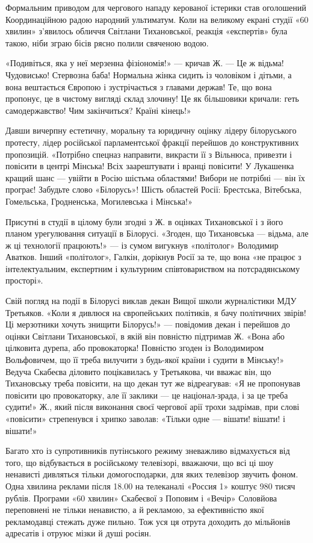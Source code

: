 Формальним приводом для чергового нападу керованої істерики став оголошений
Координаційною радою народний ультиматум.  Коли на великому екрані студії «60
хвилин» з’явилось обличчя Світлани Тихановської, реакція «експертів» була
такою, ніби зграю бісів рясно полили свяченою водою.

«Подивіться, яка у неї мерзенна фізіономія!»  --- кричав Ж. --- Це ж відьма!
Чудовисько!  Стервозна баба!  Нормальна жінка сидить із чоловіком і дітьми, а
вона вештається Європою і зустрічається з главами держав!  Те, що вона
пропонує, це в чистому вигляді склад злочину!  Це як більшовики кричали: геть
самодержавство!  Чим закінчиться?  Країні кінець!»

Давши вичерпну естетичну, моральну та юридичну оцінку лідеру білоруського
протесту, лідер російської парламентської фракції перейшов до конструктивних
пропозицій. «Потрібно спецназ направити, викрасти її з Вільнюса, привезти і
повісити в центрі Мінська!  Всіх заарештувати і вранці повісити!  У Лукашенка
кращий шанс --- увійти в Росію шістьма областями!  Вибори не потрібні --- він їх
програє!  Забудьте слово «Білорусь»!  Шість областей Росії: Брестська,
Вітебська, Гомельська, Гродненська, Могилевська і Мінська!»

Присутні в студії в цілому були згодні з Ж. в оцінках Тихановської і з його
планом урегулювання ситуації в Білорусі. «Згоден, що Тихановська --- відьма, але
ж ці технології працюють!»  --- із сумом вигукнув «політолог» Володимир Аватков.
Інший «політолог», Галкін, дорікнув Росії за те, що вона «не працює з
інтелектуальним, експертним і культурним співтовариством на потсрадянському
просторі».

Свій погляд на події в Білорусі виклав декан Вищої школи журналістики МДУ
Третьяков.  «Коли я дивлюся на європейських політиків, я бачу політичних
звірів! Ці мерзотники хочуть знищити Білорусь!»  --- повідомив декан і перейшов
до оцінки Світлани Тихановської, в якій він повністю підтримав Ж. «Вона або
цілковита дурепа, або провокаторка! Повністю згоден із Володимиром Вольфовичем,
що її треба вилучити з будь-якої країни і судити в Мінську!»  Ведуча Скабеєва
діловито поцікавилась у Третьякова, чи вважає він, що Тихановську треба
повісити, на що декан тут же відреагував: «Я не пропонував повісити цю
провокаторку, але її заклики --- це націонал-зрада, і за це треба судити!» Ж.,
який після виконання своєї чергової арії трохи задрімав, при слові «повісити»
стрепенувся і хрипко заволав: «Тільки одне --- вішати!  вішати! і вішати!»

Багато хто із супротивників путінського режиму зневажливо відмахується від
того, що відбувається в російському телевізорі, вважаючи, що всі ці шоу
ненависті дивляться тільки домогосподарки, для яких телевізор звучить фоном.
Одна хвилина реклами після 18.00 на телеканалі «Россия 1» коштує 980 тисяч
рублів.  Програми «60 хвилин» Скабеєвої з Поповим і «Вечір» Соловйова
переповнені не тільки ненавистю, а й рекламою, за ефективністю якої
рекламодавці стежать дуже пильно. Тож уся ця отрута доходить до мільйонів
адресатів і отруює мізки й душі росіян.

